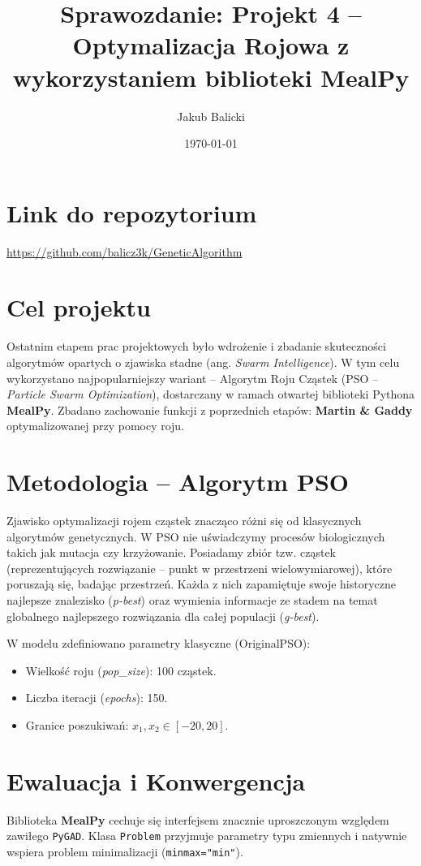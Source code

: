 \documentclass[12pt,a4paper]{article}
\title{Sprawozdanie: Projekt 4 -- Optymalizacja Rojowa z wykorzystaniem biblioteki MealPy}
\author{Jakub Balicki}
\date{\today}
\begin{document}
\maketitle

\section*{Link do repozytorium}
\url{https://github.com/balicz3k/GeneticAlgorithm}

\section{Cel projektu}
Ostatnim etapem prac projektowych było wdrożenie i zbadanie skuteczności algorytmów opartych o zjawiska stadne (ang. \textit{Swarm Intelligence}). W tym celu wykorzystano najpopularniejszy wariant -- Algorytm Roju Cząstek (PSO -- \textit{Particle Swarm Optimization}), dostarczany w ramach otwartej biblioteki Pythona \textbf{MealPy}. Zbadano zachowanie funkcji z poprzednich etapów: \textbf{Martin \& Gaddy} optymalizowanej przy pomocy roju.

\section{Metodologia -- Algorytm PSO}
Zjawisko optymalizacji rojem cząstek znacząco różni się od klasycznych algorytmów genetycznych. W PSO nie uświadczymy procesów biologicznych takich jak mutacja czy krzyżowanie. Posiadamy zbiór tzw. cząstek (reprezentujących rozwiązanie -- punkt w przestrzeni wielowymiarowej), które poruszają się, badając przestrzeń. Każda z nich zapamiętuje swoje historyczne najlepsze znalezisko (\textit{p-best}) oraz wymienia informacje ze stadem na temat globalnego najlepszego rozwiązania dla całej populacji (\textit{g-best}).

W modelu zdefiniowano parametry klasyczne (OriginalPSO):
\begin{itemize}
    \item Wielkość roju (\textit{pop\_size}): 100 cząstek.
    \item Liczba iteracji (\textit{epochs}): 150.
    \item Granice poszukiwań: $x_1, x_2 \in [-20, 20]$.
\end{itemize}

\section{Ewaluacja i Konwergencja}
Biblioteka \textbf{MealPy} cechuje się interfejsem znacznie uproszczonym względem zawiłego \texttt{PyGAD}. Klasa \texttt{Problem} przyjmuje parametry typu zmiennych i natywnie wspiera problem minimalizacji (\texttt{minmax="min"}). 
\end{document}
